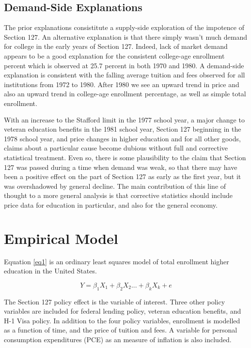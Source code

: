 \documentclass[review]{elsarticle}
\begin{document}
    \subsection{Demand-Side Explanations}
    The prior explanations consistitute a supply-side exploration of the impotence of Section 127.
    An alternative explanation is that there simply wasn't much demand for college in the early years of Section 127.
    Indeed, lack of market demand appears to be a good explanation for the consistent college-age enrollment percent
    which is observed at 25.7 percent in both 1970 and 1980.
    A demand-side explanation is consistent with the falling average tuition and fees observed for all institutions from 1972 to 1980.
    After 1980 we see an upward trend in price and also an upward trend in college-age enrollment percentage, as well as simple total enrollment.

    With an increase to the Stafford limit in the 1977 school year,
    a major change to veteran education benefits in the 1981 school year,
    Section 127 beginning in the 1978 school year,
    and price changes in higher education and for all other goods,
    claims about a particular cause become dubious without full and corrective statistical treatment.
    Even so,
    there is some plausibility to the claim that Section 127 was passed during a time when demand was weak,
    so that there may have been a positive effect on the part of Section 127 as early as the first year,
    but it was overshadowed by general decline.
    The main contribution of this line of thought to a more general analysis is that corrective statistics should include price data
    for education in particular, and also for the general economy.

    \section{Empirical Model}

    Equation \ref{eq1} is an ordinary least squares model of total enrollment higher education in the United States.

    \begin{equation}
        Y = \beta_1X_1+\beta_2X_2...+\beta_kX_k+e
        \label{eq1}
    \end{equation}

    The Section 127 policy effect is the variable of interest.
    Three other policy variables are included for federal lending policy, veteran education benefits, and H-1 Visa policy.
    In addition to the four policy variables, 
    enrollment is modelled as a function of time,
    and the price of tuition and fees.
    A variable for personal consumption expenditures (PCE) as an measure of inflation is also included.
\end{document}
